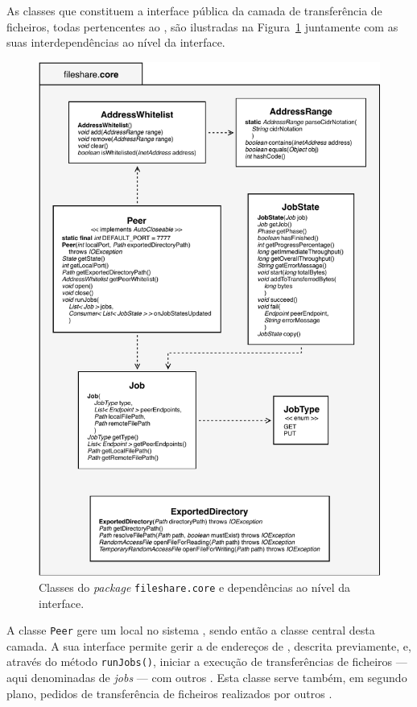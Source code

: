 As classes que constituem a interface pública da camada de transferência de ficheiros, todas pertencentes ao  , são ilustradas na Figura~\ref{fig:impl:classes-core} juntamente com as suas interdependências ao nível da interface.

\begin{figure}[p]
  \centering
  \includegraphics{figures/classes-core.pdf}
  \caption{Classes do \emph{package} \texttt{fileshare.core} e dependências ao nível da interface.}
  \label{fig:impl:classes-core}
\end{figure}

A classe \texttt{Peer} gere um  local no sistema \SYS, sendo então a classe central desta camada. A sua interface permite gerir a  de endereços de , descrita previamente, e, através do método \texttt{runJobs()}, iniciar a execução de transferências de ficheiros --- aqui denominadas de \emph{jobs} --- com outros . Esta classe serve também, em segundo plano, pedidos de transferência de ficheiros realizados por outros .

